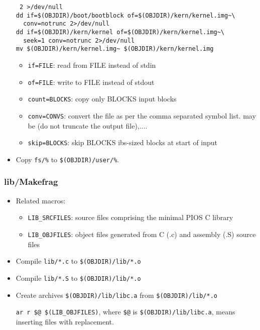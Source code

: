 \begin{itemize}
\begin{verbatim}
 2 >/dev/null
dd if=$(OBJDIR)/boot/bootblock of=$(OBJDIR)/kern/kernel.img~\
  conv=notrunc 2>/dev/null
dd if=$(OBJDIR)/kern/kernel of=$(OBJDIR)/kern/kernel.img~\
  seek=1 conv=notrunc 2>/dev/null
mv $(OBJDIR)/kern/kernel.img~ $(OBJDIR)/kern/kernel.img
\end{verbatim}
\begin{itemize}
\item \verb|if=FILE|: read from FILE instead of stdin
\item \verb|of=FILE|: write to FILE instead of stdout
\item \verb|count=BLOCKS|: copy only BLOCKS input blocks
\item \verb|conv=CONVS|: convert the file as per the comma separated symbol list.  may be (do not truncate the output file),....
\item \verb|skip=BLOCKS|: skip BLOCKS ibs-sized blocks at start of input
\end{itemize}
\item Copy \verb|fs/%| to \verb|$(OBJDIR)/user/%|.
\end{itemize}

\subsubsection{lib/Makefrag}
\begin{itemize}
\item Related macros: 
\begin{itemize}
\item \verb|LIB_SRCFILES|: source files comprising the minimal PIOS C library
\item \verb|LIB_OBJFILES|: object files generated from C (.c) and assembly (.S) source files 
\end{itemize}
\item Compile \verb|lib/*.c| to \verb|$(OBJDIR)/lib/*.o|
\item Compile \verb|lib/*.S| to \verb|$(OBJDIR)/lib/*.o|
\item Create archives \verb|$(OBJDIR)/lib/libc.a| from \verb|$(OBJDIR)/lib/*.o|

\verb|ar r $@ $(LIB_OBJFILES)|, where \verb|$@| is \verb|$(OBJDIR)/lib/libc.a|,  means inserting files with replacement.
\end{itemize}

